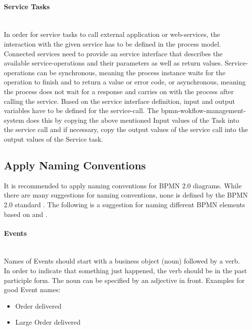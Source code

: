 \paragraph{Service Tasks}~\\
In order for service tasks to call external application or web-services, the interaction with the given service has to be defined in the process model. Connected services need to provide an service interface that describes the available service-operations and their parameters as well as return values. Service-operations can be synchronous, meaning the process instance waits for the operation to finish and to return a value or error code, or asynchronous, meaning the process does not wait for a response and carries on with the process after calling the service. Based on the service interface definition, input and output variables have to be defined for the service-call. The \gls{bpmn-wokflow-management-system} does this by copying the above mentioned Input values of the Task into the service call and if necessary, copy the output values of the service call into the output values of the Service task. \cite{fundamentals}

\subsection{Apply Naming Conventions}
\label{naming}
It is recommended to apply naming conventions for BPMN 2.0 diagrams. While there are many suggestions for naming conventions, none is defined by the BPMN 2.0 standard \cite{bpmnstandard}. The following is a suggestion for naming different BPMN elements based on  \cite{fundamentals}  \cite{suarez2010best} and \cite{radulian2020rethinking}. 

\paragraph{Events}~\\
Names of Events should start with a business object (noun) followed by a verb. In order to indicate that something just happened, the verb should be in the past participle form. The noun can be specified by an adjective in front. Examples for good Event names: 
\begin{itemize}
	\item Order delivered
	\item Large Order delivered
\end{itemize}

